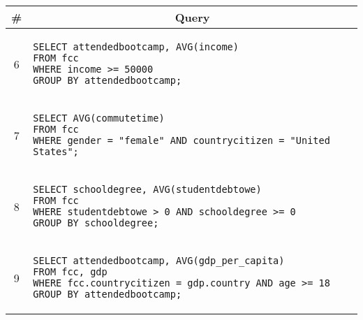 \begin{tabular}{cl}
\toprule
\# & \multicolumn{1}{c}{Query} \\
\midrule
6 & 
\begin{minipage}{6in}
\begin{lstlisting}[breaklines]
SELECT attendedbootcamp, AVG(income)
FROM fcc
WHERE income >= 50000
GROUP BY attendedbootcamp;
\end{lstlisting}
\end{minipage}{queryno} \label[query]{q6} \\
7 & 
\begin{minipage}{6in}
\begin{lstlisting}[breaklines]
SELECT AVG(commutetime)
FROM fcc
WHERE gender = "female" AND countrycitizen = "United States";
\end{lstlisting}
\end{minipage}{queryno} \label[query]{q7} \\
8 & 
\begin{minipage}{6in}
\begin{lstlisting}[breaklines]
SELECT schooldegree, AVG(studentdebtowe)
FROM fcc
WHERE studentdebtowe > 0 AND schooldegree >= 0
GROUP BY schooldegree;
\end{lstlisting}
\end{minipage}{queryno} \label[query]{q8}\\
9 & 
\begin{minipage}{6in}
\begin{lstlisting}[breaklines]
SELECT attendedbootcamp, AVG(gdp_per_capita)
FROM fcc, gdp
WHERE fcc.countrycitizen = gdp.country AND age >= 18
GROUP BY attendedbootcamp;
\end{lstlisting}
\end{minipage}{queryno} \label[query]{q9}\\
\bottomrule
\end{tabular}
